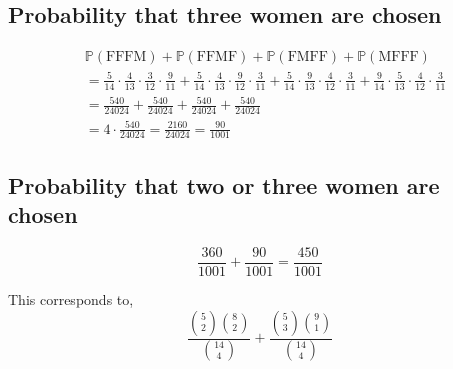 \documentclass{article}
\begin{document}
\subsection{Probability that three women are chosen}
%
\begin{align*}
  &\mathbb P(\text{FFFM}) + \mathbb P(\text{FFMF}) + \mathbb P(\text{FMFF}) + \mathbb P(\text{MFFF}) \\
  &= \frac{5}{14} \cdot \frac{4}{13} \cdot \frac{3}{12} \cdot \frac{9}{11}
  + \frac{5}{14} \cdot \frac{4}{13} \cdot \frac{9}{12} \cdot \frac{3}{11}
  + \frac{5}{14} \cdot \frac{9}{13} \cdot \frac{4}{12} \cdot \frac{3}{11}
  + \frac{9}{14} \cdot \frac{5}{13} \cdot \frac{4}{12} \cdot \frac{3}{11} \\
  &= \frac{540}{24024} + \frac{540}{24024} + \frac{540}{24024} + \frac{540}{24024} \\
  &= 4 \cdot \frac{540}{24024} = \frac{2160}{24024} = \frac{90}{1001}
\end{align*}

\subsection{Probability that two or three women are chosen}
%
\[ \frac{360}{1001} + \frac{90}{1001} = \frac{450}{1001} \]

This corresponds to,
\[ \frac{{5 \choose 2} {8 \choose 2}}{{14 \choose 4}} + \frac{{5 \choose 3} {9 \choose 1}}{{14 \choose 4}} \]
\end{document}
